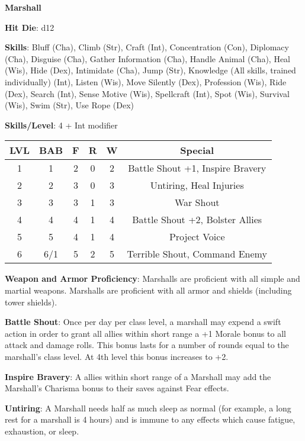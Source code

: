 \textbf{\huge{Marshall}}

\textbf{Hit Die}: d12

\textbf{Skills}: Bluff (Cha), Climb (Str), Craft (Int), Concentration (Con), Diplomacy (Cha), Disguise (Cha), Gather Information (Cha), Handle Animal (Cha), Heal (Wis), Hide (Dex), Intimidate (Cha), Jump (Str), Knowledge (All skills, trained individually) (Int), Listen (Wis), Move Silently (Dex), Profession (Wis), Ride (Dex), Search (Int), Sense Motive (Wis), Spellcraft (Int), Spot (Wis), Survival (Wis), Swim (Str), Use Rope (Dex)

\textbf{Skills/Level}: 4 + Int modifier

\begin{center}
\begin{adjustwidth}{-4cm}{}
\begin{small}
\begin{tabular}{| c | c | c | c | c | c |}
\hline
LVL &BAB &F &R &W &Special \\
\hline
1 &1 &2 &0 &2 &Battle Shout +1, Inspire Bravery \\
2 &2 &3 &0 &3 &Untiring, Heal Injuries \\
3 &3 &3 &1 &3 &War Shout \\
4 &4 &4 &1 &4 &Battle Shout +2, Bolster Allies \\
5 &5 &4 &1 &4 &Project Voice \\
6 &6/1 &5 &2 &5 &Terrible Shout, Command Enemy \\
\hline
\end{tabular}
\end{small}
\end{adjustwidth}
\end{center}

\textbf{Weapon and Armor Proficiency}: Marshalls are proficient with all simple and martial weapons. Marshalls are proficient with all armor and shields (including tower shields).

\textbf{Battle Shout}: Once per day per class level, a marshall may expend a swift action in order to grant all allies within short range a +1 Morale bonus to all attack and damage rolls. This bonus lasts for a number of rounds equal to the marshall's class level. At 4th level this bonus increases to +2.

\textbf{Inspire Bravery}: A allies within short range of a Marshall may add the Marshall’s Charisma bonus to their saves against Fear effects.

\textbf{Untiring}: A Marshall needs half as much sleep as normal (for example, a long rest for a marshall is 4 hours) and is immune to any effects which cause fatigue, exhaustion, or sleep.

